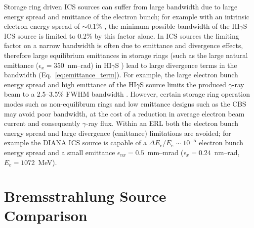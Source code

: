 \documentclass[../main.tex]{subfiles}
\begin{document}
Storage ring driven ICS sources can suffer from large bandwidth due to large energy spread and emittance of the electron bunch; for example with an intrinsic electron energy spread of $\sim0.1$\% \cite{litvinenko1996intense}, the minimum possible bandwidth of the HI$\gamma$S ICS source is limited to 0.2\% by this factor alone. In ICS sources the limiting factor on a narrow bandwidth is often due to emittance and divergence effects, therefore large equilibrium emittances in storage rings (such as the large natural emittance ($\epsilon_{x} = 350$~\si{\nano\meter}--\si{\radian}) in HI$\gamma$S \cite{weller2009research}) lead to large divergence terms in the bandwidth (Eq.~\ref{eq:emittance_term}). For example, the large electron bunch energy spread and high emittance of the HI$\gamma$S source limits the produced $\gamma$-ray beam to a 2.5--3.5\% FWHM bandwidth \cite{weller2009research}. However, certain storage ring operation modes such as non-equilibrum rings \cite{huang1998laser,owen2013nonequilibrium} and low emittance designs such as the CBS \cite{pan2019design} may avoid poor bandwidth, at the cost of a reduction in average electron beam current and consequently $\gamma$-ray flux. Within an ERL both the electron bunch energy spread and large divergence (emittance) limitations are avoided; for example the DIANA ICS source is capable of a $\Delta E_{e}/E_{e}\sim10^{-5}$ electron bunch energy spread and a small emittance $\epsilon_{nx} = 0.5$~\si{\milli\meter}--\si{\milli\radian} ($\epsilon_{x} = 0.24$~\si{\nano\meter}--\si{\radian}, $E_{e} = 1072$~\si{\mega\electronvolt}).

\section{Bremsstrahlung Source Comparison}
\label{sec:bremsstrahlung_comparison}
\end{document}
